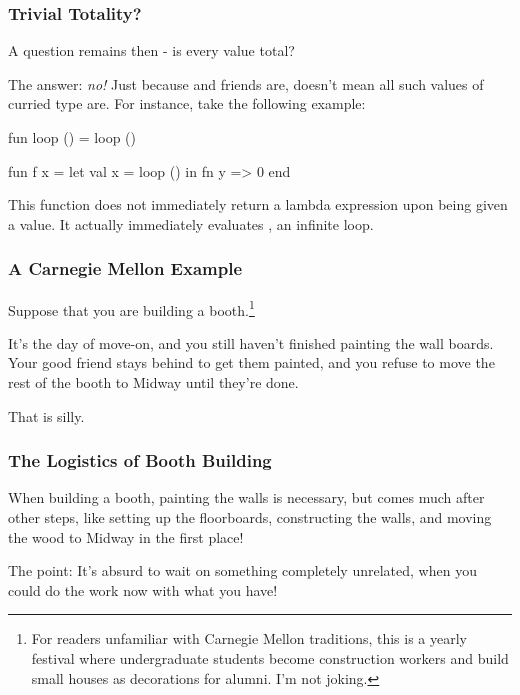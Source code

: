 \documentclass[aspectratio=169, handout]{beamer}
\begin{document}
\begin{frame}[fragile]
  \frametitle{Trivial Totality?}

  A question remains then - is every value  total?

  \pause
  \vspace{\fill}

  The answer: \textit{no!} Just because  and friends are, doesn't mean
  all such values of curried type are. For instance, take the following example:

  \pause
  \begin{codeblock}
    fun loop () = loop ()

    fun f x =
      let
        val x = loop ()
      in
        fn y => 0
      end
  \end{codeblock}

  \pause
  \vspace{\fill}

  This function does not immediately return a lambda expression upon being given a
  value. It actually immediately evaluates , an infinite loop.
\end{frame}

\begin{frame}[fragile]
  \frametitle{A Carnegie Mellon Example}

  Suppose that you are building a booth.\footnote{For readers unfamiliar with
  Carnegie Mellon traditions, this is a yearly festival where undergraduate
  students become construction workers and build small houses as decorations for
  alumni. I'm not joking.}

  \pause
  \vspace{\fill}

  It's the day of move-on, and you still haven't finished painting the wall boards. Your
  good friend stays behind to get them painted, and you refuse to move the rest of
  the booth to Midway until they're done.

  \pause
  \vspace{\fill}

  That is silly.
\end{frame}

\begin{frame}[fragile]
  \frametitle{The Logistics of Booth Building}

  When building a booth, painting the walls is necessary, but comes much after
  other steps, like setting up the floorboards, constructing the walls, and
  moving the wood to Midway in the first place!

  \pause
  \vspace{\fill}

  The point: It's absurd to wait on something completely unrelated, when you
  could do the work now with what you have!
\end{frame}
\end{document}
